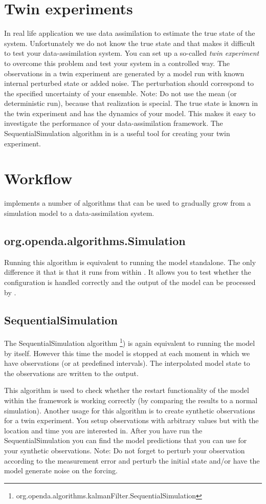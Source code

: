 \section{Twin experiments} \label{Sec:Twin}
In real life application we use data assimilation to estimate the true state of the system. Unfortunately we do not know the true state and that makes it difficult to test your data-assimilation system. You can set up a so-called \emph{twin experiment} to overcome this problem and test your system in a controlled way. The observations in a twin experiment are generated by a model run with known internal perturbed state or added noise. The perturbation should correspond to the specified uncertainty of your ensemble. Note: Do not use the mean (or deterministic run), because that realization is special. The true state is known in the twin experiment and has the dynamics of your model. This makes it easy to investigate the performance of your data-assimilation framework. The SequentialSimulation algorithm in \oda is a useful tool for creating your twin experiment.


\section{Workflow}
\oda implements a number of algorithms that can be used to gradually grow from a simulation model to a data-assimilation system.
\subsection{org.openda.algorithms.Simulation}
Running this algorithm is equivalent to running the model standalone. The only difference it that is that it runs from within \oda. It allows you to test whether the configuration is handled correctly and the output of the model can be processed by \oda. 

\subsection{SequentialSimulation}
The SequentialSimulation algorithm \footnote{org.openda.algorithms.kalmanFilter.SequentialSimulation}) is again equivalent to running the model by itself. However this time the model is stopped at each moment in which we have observations (or at predefined intervals).  The interpolated model state to the observations are written to the output. 

This algorithm is used to check whether the restart functionality of the model within the \oda framework is working correctly (by comparing the results to a normal simulation). Another usage for this algorithm is to create synthetic observations for a twin experiment. You setup observations with arbitrary values but with the location and time you are interested in. After you have run the SequentialSimulation you can find the model predictions that you can use for your synthetic observations. Note: Do not forget to perturb your observation according to the measurement error and perturb the initial state and/or have the model generate noise on the forcing.

